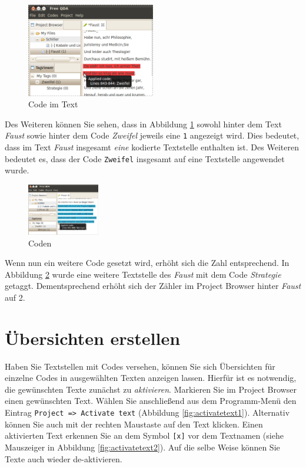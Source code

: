\begin{figure}[!hbt]
	\centering %
	 \includegraphics[width=0.5\textwidth]{img/tagtext4}
	\caption{Code im Text}
	\label{fig:texttag4}
\end{figure}

Des Weiteren können Sie sehen, dass in Abbildung \ref{fig:texttag4} sowohl hinter dem Text \textit{Faust} sowie hinter dem Code %
\textit{Zweifel} jeweils eine \texttt{1} angezeigt wird. Dies bedeutet, dass im Text \textit{Faust} insgesamt \textit{eine} kodierte %
Textstelle enthalten ist. Des Weiteren bedeutet es, dass der Code \texttt{Zweifel} insgesamt auf eine Textstelle angewendet wurde. 


\begin{figure}
 \vspace{-28pt}
 \begin{center}
    \includegraphics[width=0.28\textwidth]{img/tagtext5}
	\caption{Coden}
	\label{fig:texttag5}
  \end{center}
  \vspace{12pt}
\end{figure}

Wenn nun ein weitere Code gesetzt wird, erhöht sich die Zahl entsprechend. In Abbildung \ref{fig:texttag5} wurde eine weitere Textstelle des %
\textit{Faust} mit dem Code \textit{Strategie} getaggt. Dementsprechend erhöht sich der Zähler im Project Browser hinter \textit{Faust} %
auf 2.


\newpage
\section{Übersichten erstellen}
Haben Sie Textstellen mit Codes versehen, können Sie sich Übersichten für einzelne Codes in ausgewählten Texten anzeigen lassen. 
Hierfür ist es notwendig, die gewünschten Texte zunächst zu \textit{aktivieren}. Markieren Sie im Project Browser einen gewünschten Text. %
Wählen Sie anschließend aus dem Programm-Menü den Eintrag \texttt{Project => Activate text} (Abbildung \ref{fig:activatetext1}). %
Alternativ können Sie auch mit der rechten Maustaste auf den Text klicken. Einen aktivierten Text erkennen Sie an dem Symbol \texttt{[x]} %
vor dem Textnamen (siehe Mauszeiger in Abbildung \ref{fig:activatetext2}). Auf die selbe Weise können Sie Texte auch wieder de-aktivieren.

